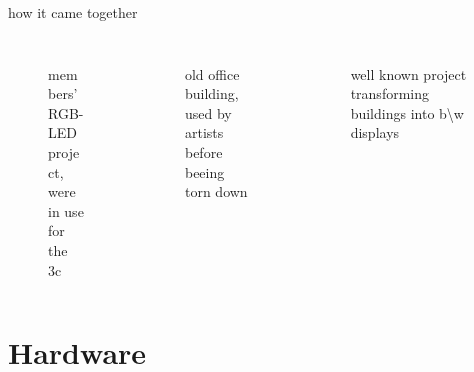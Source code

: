 \documentclass{beamer}
\begin{document}
\begin{frame}{how it came together}
\begin{columns}
\begin{column}{3.5cm}
\begin{figure}
\begin{center}
          \end{center}
        \end{figure}
\end{column}
\end{columns}
\begin{columns}[T]
\begin{column}{3.5cm}
        \begin{figure}
          \begin{center}
          members' RGB-LED project, \\were in use for the 3c
          \end{center}
        \end{figure}
 
\end{column}
\begin{column}{3.5cm}
        \begin{figure}
          \begin{center}
          old office building,\\used by artists before beeing torn down
          \end{center}
        \end{figure}
 
\end{column}
\begin{column}{3.5cm}
        \begin{figure}
          \begin{center}
          well known project transforming buildings into b\textbackslash w displays
          \end{center}
        \end{figure}
 
    \end{column}
\end{columns}
\end{frame}
\section{Hardware}
\end{document}
